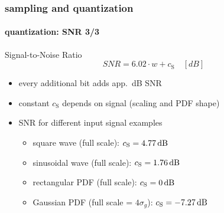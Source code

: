 	\begin{frame}\frametitle{sampling and quantization}\framesubtitle{quantization: SNR 3/3}
		\vspace{-5mm}\toremember{}
        \vspace{-3mm}
        \begin{block}{Signal-to-Noise Ratio}
			\centering
			\begin{equation*}
				SNR = 6.02\cdot w + c_{\mathrm{S}}\quad [dB]
			\end{equation*}
            \vspace{-2mm}
			\begin{itemize}
				\item	every additional bit adds app.\ \unit[6]{dB} SNR
				\item	constant $c_{\mathrm{S}}$ depends on signal (scaling and PDF shape)
			\end{itemize}
		\end{block}
        \pause
		\begin{itemize}
            \item[] SNR for different input signal examples
                \begin{itemize}
                    \item	square wave (full scale): $c_{\mathrm{S}} =  \unit[4.77]{dB}$
                    \item	sinusoidal wave (full scale): $c_{\mathrm{S}} =  \unit[1.76]{dB}$
                    \item	rectangular {PDF} (full scale): $c_{\mathrm{S}} =  \unit[0]{dB}$
                    \item	Gaussian {PDF} (full scale = $4\sigma_{g}$): $c_{\mathrm{S}} =  \unit[-7.27]{dB}$
                \end{itemize}
		\end{itemize}
	\end{frame}		
